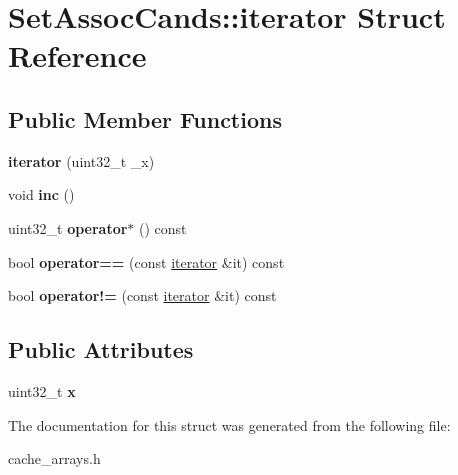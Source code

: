 \hypertarget{structSetAssocCands_1_1iterator}{\section{Set\-Assoc\-Cands\-:\-:iterator Struct Reference}
\label{structSetAssocCands_1_1iterator}
}
\subsection*{Public Member Functions}
\begin{DoxyCompactItemize}
\item 
\hypertarget{structSetAssocCands_1_1iterator_a7550aa1f23e9c054d56bd0a407802407}{{\bfseries iterator} (uint32\-\_\-t \-\_\-x)}\label{structSetAssocCands_1_1iterator_a7550aa1f23e9c054d56bd0a407802407}

\item 
\hypertarget{structSetAssocCands_1_1iterator_a6f5e0190afa66a9ebc293b8133313c0f}{void {\bfseries inc} ()}\label{structSetAssocCands_1_1iterator_a6f5e0190afa66a9ebc293b8133313c0f}

\item 
\hypertarget{structSetAssocCands_1_1iterator_a4d450ed0e6772ec671a108feedd60cde}{uint32\-\_\-t {\bfseries operator$\ast$} () const }\label{structSetAssocCands_1_1iterator_a4d450ed0e6772ec671a108feedd60cde}

\item 
\hypertarget{structSetAssocCands_1_1iterator_a4bbcff037b552d5c3d688d99dc5213e4}{bool {\bfseries operator==} (const \hyperlink{structSetAssocCands_1_1iterator}{iterator} \&it) const }\label{structSetAssocCands_1_1iterator_a4bbcff037b552d5c3d688d99dc5213e4}

\item 
\hypertarget{structSetAssocCands_1_1iterator_a555a0a7326ba2905645da079a6ede142}{bool {\bfseries operator!=} (const \hyperlink{structSetAssocCands_1_1iterator}{iterator} \&it) const }\label{structSetAssocCands_1_1iterator_a555a0a7326ba2905645da079a6ede142}

\end{DoxyCompactItemize}
\subsection*{Public Attributes}
\begin{DoxyCompactItemize}
\item 
\hypertarget{structSetAssocCands_1_1iterator_a524ac7e35f5ea7b1ea98423cb1dac1d4}{uint32\-\_\-t {\bfseries x}}\label{structSetAssocCands_1_1iterator_a524ac7e35f5ea7b1ea98423cb1dac1d4}

\end{DoxyCompactItemize}


The documentation for this struct was generated from the following file\-:\begin{DoxyCompactItemize}
\item 
cache\-\_\-arrays.\-h\end{DoxyCompactItemize}
